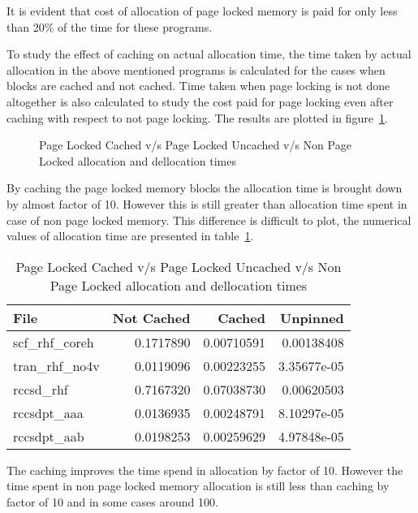 It is evident that cost of allocation of page locked memory is
paid for only less than 20\% of the time for these programs.

To study the effect of caching on actual allocation time, the time taken by actual
allocation in the above mentioned programs is calculated for the cases when blocks
are cached and not cached. Time taken when page locking is not done altogether is
also calculated to study the cost paid for page locking even after caching with
respect to not page locking. The results are plotted in figure~\ref{fig:mempin_caching}.

\begin{figure}[h]
  
  \caption{Page Locked Cached v/s Page Locked Uncached v/s Non Page Locked allocation
  and dellocation times}
  \label{fig:mempin_caching}
\end{figure}

By caching the page locked memory blocks the allocation time is brought down by
almost factor of 10. However this is still greater than allocation time spent in
case of non page locked memory. This difference is difficult to plot, the numerical
values of allocation time are presented in table~\ref{tab:mempin_caching}.

\begin{table}[h]
  \centering
  \begin{tabular}{l | r | r | r}
    \hline
    File            & Not Cached & Cached     & Unpinned    \\
    \hline
    scf\_rhf\_coreh & 0.1717890  & 0.00710591 & 0.00138408  \\
    tran\_rhf\_no4v & 0.0119096  & 0.00223255 & 3.35677e-05 \\
    rccsd\_rhf      & 0.7167320  & 0.07038730 & 0.00620503  \\
    rccsdpt\_aaa    & 0.0136935  & 0.00248791 & 8.10297e-05 \\
    rccsdpt\_aab    & 0.0198253  & 0.00259629 & 4.97848e-05 \\
    \hline
  \end{tabular}
  \caption{Page Locked Cached v/s Page Locked Uncached v/s Non Page Locked allocation
  and dellocation times}
  \label{tab:mempin_caching}
\end{table}

The caching improves the time spend in allocation by factor of 10. However the time
spent in non page locked memory allocation is still less than caching by factor
of 10 and in some cases around 100.